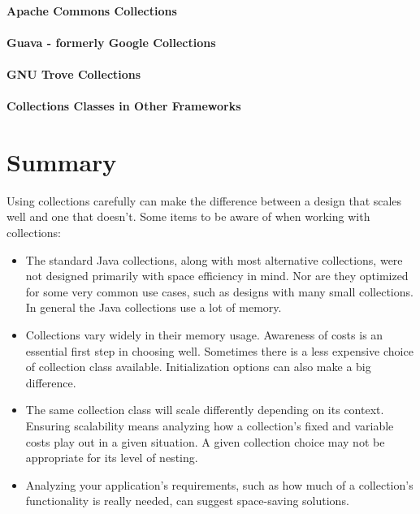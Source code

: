 \paragraph{Apache Commons Collections}

\paragraph{Guava - formerly Google Collections}

\paragraph{GNU Trove Collections}

\paragraph{Collections Classes in Other Frameworks}

\section{Summary}
Using collections carefully can
make the difference between a design that scales well and one that
doesn't. Some items to be aware of when working with collections:
\begin{itemize}
  \item The standard Java collections, along with most alternative
  collections, were not designed primarily with space efficiency in mind. Nor
  are they optimized for some very common use cases, such as designs with many small collections.
  In general the Java collections use a lot of memory.
  \item Collections vary widely in their memory usage. Awareness of
  costs is an essential first step in choosing well. Sometimes there is a less
  expensive choice of collection class available. Initialization options
  can also make a big difference.
  \item The same collection class will scale differently depending on its
  context. Ensuring scalability means
  analyzing how a collection's fixed and variable costs
  play out in a given situation. A given collection choice may not be appropriate for its level of nesting.
  \item Analyzing your application's requirements, such as 
  how much of a collection's functionality is really needed, can suggest
  space-saving solutions.
\end{itemize}
